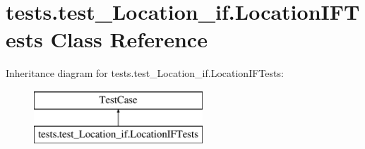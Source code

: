 \hypertarget{classtests_1_1test___location__if_1_1_location_i_f_tests}{\section{tests.\-test\-\_\-\-Location\-\_\-if.\-Location\-I\-F\-Tests Class Reference}
\label{classtests_1_1test___location__if_1_1_location_i_f_tests}
}
Inheritance diagram for tests.\-test\-\_\-\-Location\-\_\-if.\-Location\-I\-F\-Tests\-:\begin{figure}[H]
\begin{center}
\leavevmode
\includegraphics[height=2.000000cm]{classtests_1_1test___location__if_1_1_location_i_f_tests}
\end{center}
\end{figure}
